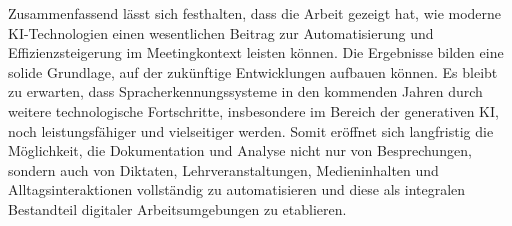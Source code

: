 Zusammenfassend lässt sich festhalten, dass die Arbeit gezeigt hat, wie moderne KI-Technologien einen wesentlichen Beitrag zur Automatisierung und Effizienzsteigerung im Meetingkontext leisten können. Die Ergebnisse bilden eine solide Grundlage, auf der zukünftige Entwicklungen aufbauen können. Es bleibt zu erwarten, dass Spracherkennungssysteme in den kommenden Jahren durch weitere technologische Fortschritte, insbesondere im Bereich der generativen KI, noch leistungsfähiger und vielseitiger werden. Somit eröffnet sich langfristig die Möglichkeit, die Dokumentation und Analyse nicht nur von Besprechungen, sondern auch von Diktaten, Lehrveranstaltungen, Medieninhalten und Alltagsinteraktionen vollständig zu automatisieren und diese als integralen Bestandteil digitaler Arbeitsumgebungen zu etablieren.